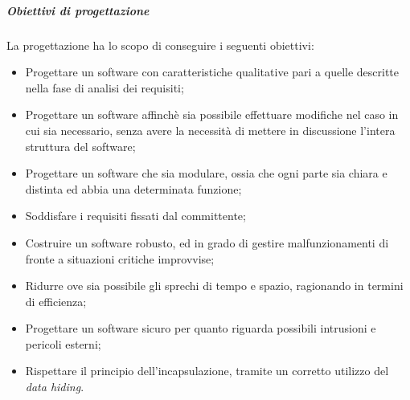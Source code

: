 	\subparagraph{Obiettivi di progettazione}
	La progettazione ha lo scopo di conseguire i seguenti obiettivi:
	\begin{itemize}
		\item  Progettare un software con caratteristiche qualitative pari a quelle descritte nella fase di analisi dei requisiti;
		\item  Progettare un software affinchè sia possibile effettuare modifiche nel caso in cui sia necessario, senza avere la necessità di mettere in discussione l'intera struttura del software;
		\item  Progettare un software che sia modulare, ossia che ogni parte sia chiara e distinta ed abbia una determinata funzione;
		\item Soddisfare i requisiti fissati dal committente;
		\item Costruire un software robusto, ed in grado di gestire malfunzionamenti di fronte a situazioni critiche improvvise;
		\item Ridurre ove sia possibile gli sprechi di tempo e spazio, ragionando in termini di efficienza;
		\item Progettare un software sicuro per quanto riguarda possibili intrusioni e pericoli esterni;
		\item Rispettare il principio dell'incapsulazione, tramite un corretto utilizzo del \emph{data hiding}.
	\end{itemize}
	
	
